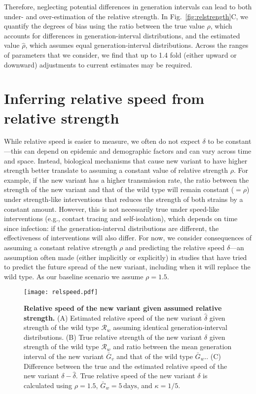 \documentclass[12pt]{article}
\newcommand{\fref}[1]{Fig.~\ref{fig:#1}}
\newcommand{\RR}{\ensuremath{{\mathcal R}}\xspace}
\begin{document}
Therefore, neglecting potential differences in generation intervals can lead to both under- and over-estimation of the relative strength.
In \fref{relstrength}C, we quantify the degrees of bias using the ratio between the true value $\rho$, which accounts for differences in generation-interval distributions, and the estimated value $\hat{\rho}$, which assumes equal generation-interval distributions.
Across the ranges of parameters that we consider, we find that up to 1.4 fold (either upward or downward) adjustments to current estimates may be required.

\section{Inferring relative speed from relative strength}

While relative speed is easier to measure, we often do not expect $\delta$ to be constant---this can depend on epidemic and demographic factors and can vary across time and space.
Instead, biological mechanisms that cause new variant to have higher strength better translate to assuming a constant value of relative strength $\rho$.
For example, if the new variant has a higher transmission rate, the ratio between the strength of the new variant and that of the wild type will remain constant ($=\rho$) under strength-like interventions that reduces the strength of both strains by a constant amount.
However, this is not necessarily true under speed-like interventions (e.g., contact tracing and self-isolation), which depends on time since infection: if the generation-interval distributions are different, the effectiveness of interventions will also differ.
For now, we consider consequences of assuming a constant relative strength $\rho$ and predicting the relative speed $\delta$---an assumption often made (either implicitly or explicitly) in studies that have tried to predict the future spread of the new variant, including when it will replace the wild type.
As our baseline scenario we assume $\rho = 1.5$.

\begin{figure}[!th]
\texttt{[image: relspeed.pdf]}
\caption{
\textbf{Relative speed of the new variant given assumed relative strength.}
(A) Estimated relative speed of the new variant $\hat{\delta}$ given strength of the wild type $\RR_w$ assuming identical generation-interval distributions.
(B) True relative strength of the new variant $\delta$ given strength of the wild type $\RR_w$ and ratio between the mean generation interval of the new variant $\bar{G}_v$ and that of the wild type $\bar{G}_w$..
(C) Difference between the true and the estimated relative speed of the new variant $\delta - \hat{\delta}$.
True relative speed of the new variant $\delta$ is calculated using $\rho=1.5$, $\bar{G}_w = 5\,\textrm{days}$, and $\kappa=1/5$.
}
\label{fig:relspeed}
\end{figure}
\end{document}
